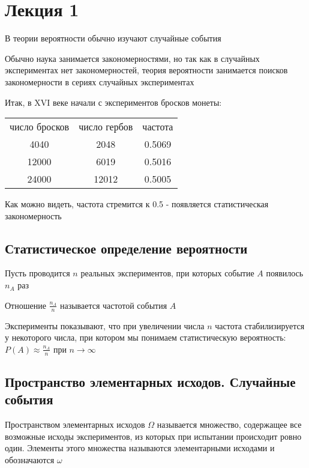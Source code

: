 \documentclass[12pt]{article}
\begin{document}
    \section{Лекция 1}

    В теории вероятности обычно изучают случайные события

    Обычно наука занимается закономерностями, но так как в случайных экспериментах нет закономерностей, теория
    вероятности занимается поисков закономерности в сериях случайных экспериментах

    Итак, в XVI веке начали с экспериментов бросков монеты:

    \begin{tabular}{ccc}
        число бросков & число гербов & частота \\
        4040 & 2048 & 0.5069 \\
        12000 & 6019 & 0.5016 \\
        24000 & 12012 & 0.5005 \\
    \end{tabular}

    Как можно видеть, частота стремится к 0.5 - появляется статистическая закономерность

    \hypertarget{statisticaldefinitionofprobability}{}

    \subsection{Статистическое определение вероятности}

    Пусть проводится $n$ реальных экспериментов, при которых событие $A$ появилось $n_A$ раз

    Отношение $\frac{n_A}{n}$ называется частотой события $A$

    Эксперименты показывают, что при увеличении числа $n$ частота стабилизируется у некоторого числа,
    при котором мы понимаем статистическую вероятность: $P(A) \approx \frac{n_A}{n}$ при $n \to \infty$

    \subsection{Пространство элементарных исходов. Случайные события}

    \hypertarget{spaceofelementaryoutcomes}{}

    \Def Пространством элементарных исходов $\Omega$ называется множество, содержащее все возможные исходы
    экспериментов, из которых при испытании происходит ровно один. Элементы этого множества называются
    элементарными исходами и обозначаются $\omega$
\end{document}
